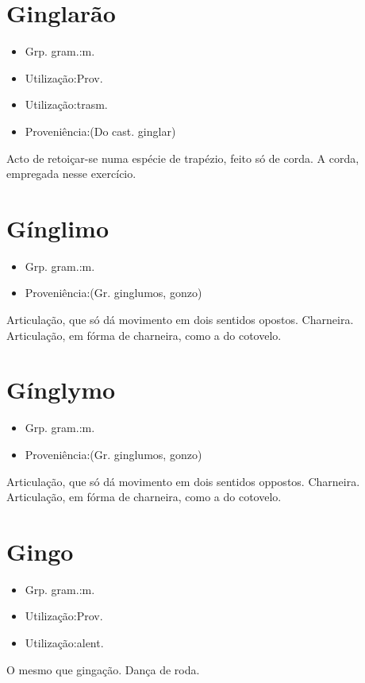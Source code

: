 \section{Ginglarão}
\begin{itemize}
\item {Grp. gram.:m.}
\end{itemize}
\begin{itemize}
\item {Utilização:Prov.}
\end{itemize}
\begin{itemize}
\item {Utilização:trasm.}
\end{itemize}
\begin{itemize}
\item {Proveniência:(Do cast. \textunderscore ginglar\textunderscore )}
\end{itemize}
Acto de retoiçar-se numa espécie de trapézio, feito só de corda.
A corda, empregada nesse exercício.
\section{Gínglimo}
\begin{itemize}
\item {Grp. gram.:m.}
\end{itemize}
\begin{itemize}
\item {Proveniência:(Gr. \textunderscore ginglumos\textunderscore , gonzo)}
\end{itemize}
Articulação, que só dá movimento em dois sentidos opostos.
Charneira.
Articulação, em fórma de charneira, como a do cotovelo.
\section{Gínglymo}
\begin{itemize}
\item {Grp. gram.:m.}
\end{itemize}
\begin{itemize}
\item {Proveniência:(Gr. \textunderscore ginglumos\textunderscore , gonzo)}
\end{itemize}
Articulação, que só dá movimento em dois sentidos oppostos.
Charneira.
Articulação, em fórma de charneira, como a do cotovelo.
\section{Gingo}
\begin{itemize}
\item {Grp. gram.:m.}
\end{itemize}
\begin{itemize}
\item {Utilização:Prov.}
\end{itemize}
\begin{itemize}
\item {Utilização:alent.}
\end{itemize}
O mesmo que \textunderscore gingação\textunderscore .
Dança de roda.
